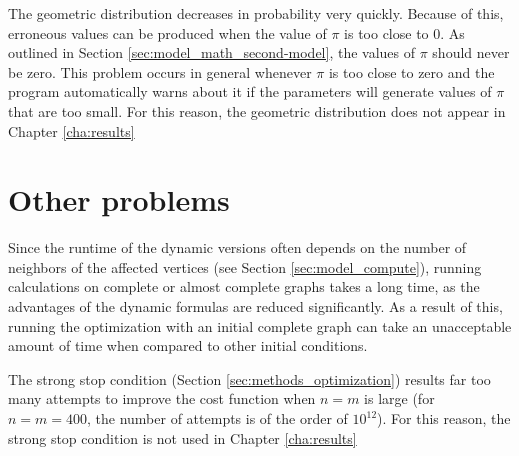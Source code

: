 The geometric distribution decreases in probability very quickly.
Because of this, erroneous values can be produced when the value of $\pi$ is too close to 0.
As outlined in Section \ref{sec:model_math_second-model}, the values of $\pi$ should never be zero.
This problem occurs in general whenever $\pi$ is too close to zero and the program automatically warns about it if the parameters will generate values of $\pi$ that are too small.
For this reason, the geometric distribution does not appear in Chapter \ref{cha:results}

\section{Other problems}
\label{sec:methods_other-probs}

Since the runtime of the dynamic versions often depends on the number of neighbors of the affected vertices (see Section \ref{sec:model_compute}), running calculations on complete or almost complete graphs takes a long time, as the advantages of the dynamic formulas are reduced significantly.
As a result of this, running the optimization with an initial complete graph can take an unacceptable amount of time when compared to other initial conditions.

The strong stop condition (Section \ref{sec:methods_optimization}) results far too many attempts to improve the cost function when $n=m$ is large (for $n=m=400$, the number of attempts is of the order of $10^{12}$).
For this reason, the strong stop condition is not used in Chapter \ref{cha:results}

